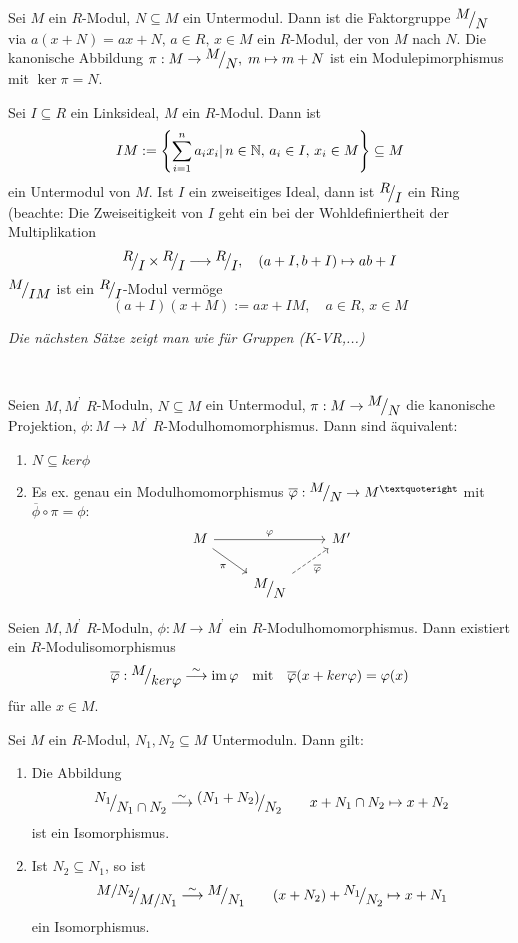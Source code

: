 \begin{bem+df}\label{1.9}
	Sei $M$ ein $R$-Modul, $N\subseteq M$ ein Untermodul. Dann ist die Faktorgruppe $\QR{M}{N}$ via $a(x+N) = ax+N, \, a\in R, \,x\in M$ ein $R$-Modul, der  von $M$ nach $N$. Die kanonische Abbildung $\pi:M \to \QR{M}{N}, \; m \mapsto m+N$ ist ein Modulepimorphismus mit $\ker \pi = N$.
\end{bem+df}
\begin{bsp}
	Sei $I\subseteq R$ ein Linksideal, $M$ ein $R$-Modul. Dann ist 
	$$IM:= \left\{\sum_{i=1}^n a_i x_i|\, n\in \mathbb{N}, \, a_i \in I, \, x_i \in M\right\}\subseteq M$$
	ein Untermodul von $M$. Ist $I$ ein zweiseitiges Ideal, dann ist $\QR{R}{I}$ ein Ring (beachte: Die Zweiseitigkeit von $I$ geht ein bei der Wohldefiniertheit der Multiplikation
	$$\QR{R}{I} \times \QR{R}{I} \longrightarrow \QR{R}{I}, \quad (a+I, b+I) \mapsto ab+I$$
	$\QR{M}{IM}$ ist ein $\QR{R}{I}$-Modul vermöge
	$$(a+I)(x+M) := ax+IM, \quad a\in R, \, x\in M$$ 
\end{bsp}
\begin{center}
	\emph{Die nächsten Sätze zeigt man wie für Gruppen ($K$-VR,...)}
\end{center}
\ 
\begin{sa}\label{1.11}
	Seien $M, M^{’} $ $R$-Moduln, $N \subseteq M $ ein Untermodul, $ \pi: M \to \QR{M}{N} $ die kanonische Projektion, $\phi: M \to M^{’} $ $R$-Modulhomomorphismus. Dann sind äquivalent: 
\begin{enumerate}[label= \roman*)]
	\item $N \subseteq ker\phi$
	\item Es ex. genau ein Modulhomomorphismus $\overline{\phi}: \QR{M}{N} \to M^{’} $ mit $\overline{\phi} \circ \pi = \phi:$
	$$\begin{tikzcd}
	M \arrow[swap]{dr}{\pi} \arrow{rr}{\phi} & & M'\\
	& \QR{M}{N} \arrow[swap,dashed]{ru}{\overline{\phi}}&
	\end{tikzcd}$$
	\end{enumerate}
\end{sa}
\begin{sa}[Homomorphiesatz] Seien $M, M^{’} $ $R$-Moduln,  $\phi: M \to M^{’} $ ein $R$-Modulhomomorphismus. Dann existiert ein $R$-Modulisomorphismus $$\overline{\phi}: \QR{M}{ker\phi} \overset{\sim}{\longrightarrow} \im\phi \quad \text{mit} \quad \overline{\phi}(x+ker\phi)=\phi(x)$$ für alle $ x \in M$.
\end{sa}
\begin{sa}[Isomorphiesaätze]\label{sa1.13}Sei $M$ ein $R$-Modul, $N_1, N_2 \subseteq M$ Untermoduln. Dann gilt:
	\begin{enumerate}[label=\alph*)]
		\item Die Abbildung$$\QR{N_1}{N_1 \cap N_2} \overset{\sim}{\longrightarrow} \QR{(N_1+N_2)}{N_2} \qquad x + N_1\cap N_2  \mapsto x +N_2$$ ist ein Isomorphismus.
		\item Ist $ N_2 \subseteq N_1$, so ist
		 $$\QR{M/N_2}{M/N_1} \overset{\sim}{\longrightarrow} \QR{M}{N_1}\qquad (x+N_2)+\QR{N_1}{N_2} \mapsto x+N_1$$
		 ein Isomorphismus.
	\end{enumerate}
\end{sa}
